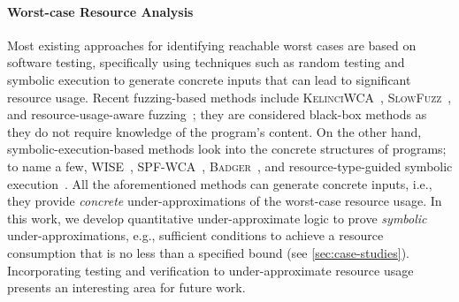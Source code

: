 \paragraph*{Worst-case Resource Analysis}
%
Most existing approaches for identifying reachable worst cases are based on software testing, specifically using techniques such as random testing and symbolic execution to generate concrete inputs that can lead to significant resource usage. 
%
Recent fuzzing-based methods include \textsc{KelinciWCA}~\cite{ISSTA:NKP18}, \textsc{SlowFuzz}~\cite{CCS:PZK17}, and resource-usage-aware fuzzing~\cite{FASE:CHL22}; they are considered black-box methods as they do not require knowledge of the program's content.
%
On the other hand, symbolic-execution-based methods look into the concrete structures of programs; to name a few, WISE~\cite{ICSE:BJS09}, SPF-WCA~\cite{ICST:LKP17}, \textsc{Badger}~\cite{ISSTA:NKP18}, and resource-type-guided symbolic execution~\cite{POPL:WH19}.
%
All the aforementioned methods can generate concrete inputs, i.e., they provide \emph{concrete} under-approximations of the worst-case resource usage.
%
In this work, we develop quantitative under-approximate logic to prove \emph{symbolic} under-approximations, e.g., sufficient conditions to achieve a resource consumption that is no less than a specified bound (see \cref{sec:case-studies}).
%
Incorporating testing and verification to under-approximate resource usage presents an interesting area for future work.